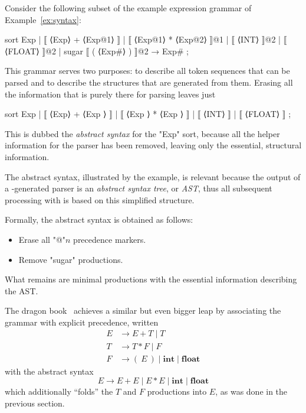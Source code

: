 \documentclass[12pt]{article} %
\begin{document}
\begin{example}\label{ex:ast}%
  Consider the following subset of the example expression grammar of Example~\ref{ex:syntax}:
  \begin{hacs}[xleftmargin=\parindent]
sort Exp  | ⟦ ⟨Exp⟩ + ⟨Exp@1⟩ ⟧
           | ⟦ ⟨Exp@1⟩ * ⟨Exp@2⟩ ⟧@1
           | ⟦ ⟨INT⟩ ⟧@2
           | ⟦ ⟨FLOAT⟩ ⟧@2
           | sugar ⟦ ( ⟨Exp#⟩ ) ⟧@2 → Exp# ;
  \end{hacs}
  This grammar serves two purposes: to describe all token sequences that can be parsed and to
  describe the structures that are generated from them. Erasing all the information that is purely
  there for parsing leaves just
  \begin{hacs}[xleftmargin=\parindent]
sort Exp  | ⟦ ⟨Exp⟩ + ⟨Exp  ⟩ ⟧
           | ⟦ ⟨Exp  ⟩ * ⟨Exp  ⟩ ⟧
           | ⟦ ⟨INT⟩ ⟧
           | ⟦ ⟨FLOAT⟩ ⟧ ;
  \end{hacs}
  This is dubbed the \emph{abstract syntax} for the "Exp" sort, because all the helper information
  for the parser has been removed, leaving only the essential, structural information.
\end{example}

The abstract syntax, illustrated by the example, is relevant because the output of a \HAX-generated
parser is an \emph{abstract syntax tree}, or \emph{AST}, thus all subsequent processing with \HAX is
based on this simplified structure.

Formally, the abstract syntax is obtained as follows:
\begin{itemize}
\item Erase all "@"$n$ precedence markers.
\item Remove "sugar" productions.
\end{itemize}
What remains are minimal productions with the essential information describing the AST.

{\small\begin{remark}%
    The dragon book~\cite{Aho+:2006} achieves a similar but even bigger leap by associating the
    grammar with explicit precedence, written
    \begin{align*}
      E &→ E+T \mid T \\
      T &→ T*F \mid F \\
      F &→ (~E~) \mid \textbf{int} \mid \textbf{float}
    \end{align*}
    with the abstract syntax
    \begin{displaymath}
      E → E+E \mid E*E \mid \textbf{int} \mid \textbf{float}
    \end{displaymath}
    which additionally ``folds'' the $T$ and $F$ productions into $E$, as was done in the previous
    section.
  \end{remark}}
\end{document}
